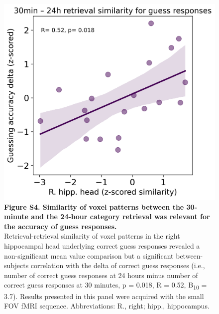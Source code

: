  \begin{figure}[!ht]
    \centering
     \includegraphics[width=0.6\linewidth]{paper/src/figures/20240530_hipp-array_n_ret1_ret2_perm_consc_unconsc_corr-unconsc_incorr_R. hipp. head_ERS_correl.png}
     \caption*{\textbf{Figure S4. Similarity of voxel patterns between the 30-minute and the 24-hour category retrieval was relevant for the accuracy of guess responses.} \\ \vspace{0.5em}
Retrieval-retrieval similarity of voxel patterns in the right hippocampal head underlying correct guess responses revealed a non-significant mean value comparison but a significant between-subjects correlation with the delta of correct guess responses (i.e., number of correct guess responses at 24 hours minus number of correct guess responses at 30 minutes, p = 0.018, R = 0.52, B\textsubscript{10} = 3.7). Results presented in this panel were acquired with the small FOV fMRI sequence. Abbreviations: R., right; hipp., hippocampus.}
\end{figure}



\newpage

